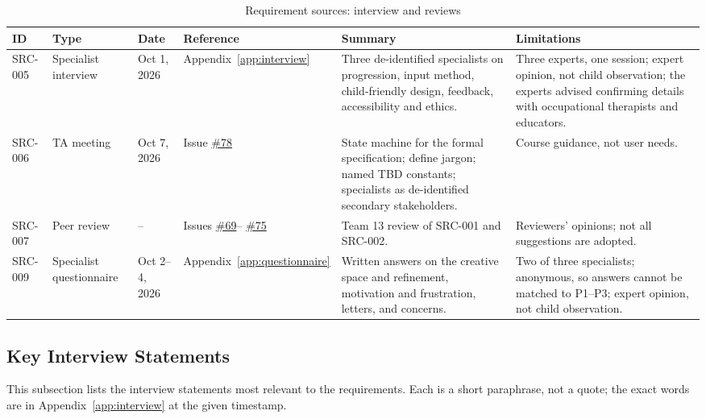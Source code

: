 \documentclass[12pt]{article}
\renewcommand{\_}{\textunderscore\allowbreak}%
\begin{document}
\begin{table}[H]
\centering
\caption{Requirement sources: interview and reviews}
\label{tab:src-other}
\footnotesize
\begin{tabularx}{\textwidth}{@{}
  >{\raggedright\arraybackslash}p{1.3cm} >{\raggedright\arraybackslash}p{1.9cm}
  >{\raggedright\arraybackslash}p{1.4cm} >{\raggedright\arraybackslash}X
  >{\raggedright\arraybackslash}X >{\raggedright\arraybackslash}X@{}}
\toprule
\textbf{ID} & \textbf{Type} & \textbf{Date} & \textbf{Reference} &
\textbf{Summary} & \textbf{Limitations} \\
\midrule
{}\label{src:005}SRC-005 & Specialist interview & Oct 1, 2026 &
Appendix~\ref{app:interview} & Three de-identified specialists on progression,
input method, child-friendly design, feedback, accessibility and ethics. & Three
experts, one session; expert opinion, not child observation; the experts advised
confirming details with occupational therapists and educators. \\
\label{src:006}SRC-006 & TA meeting & Oct 7, 2026 & Issue
  \href{https://github.com/AHMEDELZARIA/squigglr/issues/78}{\#78} & State
  machine for the formal specification; define jargon; named TBD constants;
  specialists as de-identified secondary stakeholders. & Course guidance, not
  user needs. \\
\label{src:007}SRC-007 & Peer review & -- & Issues
  \href{https://github.com/AHMEDELZARIA/squigglr/issues/69}{\#69}--%
  \href{https://github.com/AHMEDELZARIA/squigglr/issues/75}{\#75} & Team 13
review of SRC-001 and SRC-002. & Reviewers' opinions; not all suggestions are
adopted. \\
\label{src:009}SRC-009 & Specialist questionnaire & Oct 2--4,
2026 & Appendix~\ref{app:questionnaire} & Written answers on the creative space
and refinement, motivation and frustration, letters, and concerns. & Two of
three specialists; anonymous, so answers cannot be matched to P1--P3; expert
opinion, not child observation. \\
\bottomrule
\end{tabularx}
\end{table}

\subsection{Key Interview Statements}
\label{sec:src-interview}

This subsection lists the interview statements most relevant to the
requirements. Each is a short paraphrase, not a quote; the exact words are in
Appendix~\ref{app:interview} at the given timestamp.
\end{document}
